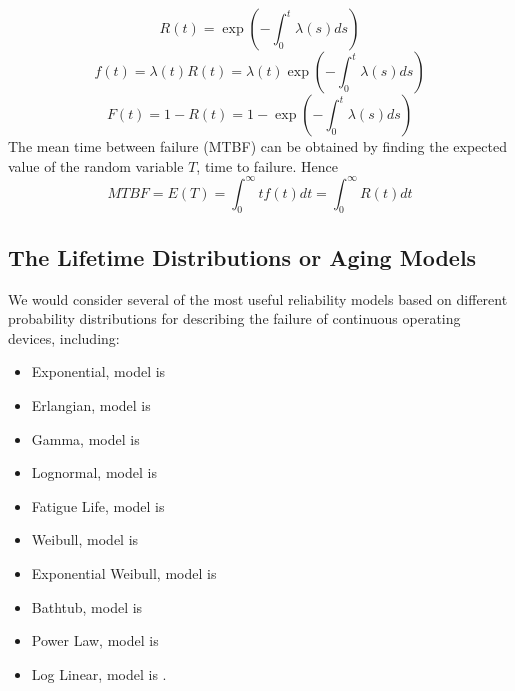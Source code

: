 \begin{equation}
  R(t) = \exp(-\int_{0}^{t} \lambda (s)ds)
\end{equation}
\begin{equation}
	f(t) = \lambda (t)R(t) = \lambda (t)\exp(-\int_{0}^{t} \lambda (s)ds)
\end{equation}
\begin{equation}
 	F(t) = 1 - R(t) = 1 - \exp(-\int_{0}^{t} \lambda (s)ds)
\end{equation}
The mean time between failure (MTBF) can be obtained by finding the expected value of the random variable
$T$, time to failure. Hence
\begin{equation}
  MTBF = E(T) = \int_{0}^{\infty} tf(t)dt = \int_{0}^{\infty} R(t)dt
\end{equation}

\subsection{The Lifetime Distributions or Aging Models}
We would consider several of the most useful reliability models based on different probability
distributions for describing the failure of continuous operating devices, including:
\begin{itemize}
	\item Exponential, model  is 
	\item Erlangian, model  is 
	\item Gamma, model  is 
	\item Lognormal, model  is 
	\item Fatigue Life, model  is 
	\item Weibull, model  is 
	\item Exponential Weibull, model  is 
	\item Bathtub, model  is 
	\item Power Law, model  is 
	\item Log Linear, model  is .
\end{itemize}

